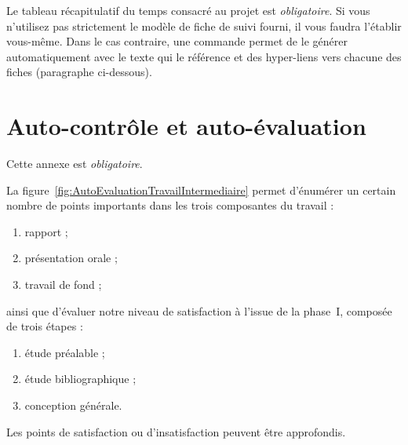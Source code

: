 \documentclass[11pt, french]{report-rd-info}
\begin{document}
Le tableau récapitulatif du temps consacré au projet est \emph{obligatoire}. Si vous n'utilisez pas strictement le modèle de fiche de suivi fourni, il vous faudra l'établir vous-même. Dans le cas contraire, une commande permet de le générer automatiquement avec le texte qui le référence et des hyper-liens vers chacune des fiches (paragraphe ci-dessous).

\printweeksummary

\chapter{Auto-contrôle et auto-évaluation}

Cette annexe est \emph{obligatoire}.

La figure~\ref{fig:AutoEvaluationTravailIntermediaire} permet d'énumérer un certain nombre de points importants dans les trois composantes du travail :
\begin{enumerate}
   \item rapport ;
   \item présentation orale ;
   \item travail de fond ;
\end{enumerate}
ainsi que d'évaluer notre niveau de satisfaction à l'issue de la phase~I, composée de trois étapes :
\begin{enumerate}
	\item étude préalable ;
	\item étude bibliographique ;
	\item conception générale.
\end{enumerate}

Les points de satisfaction ou d'insatisfaction peuvent être approfondis.
\end{document}
